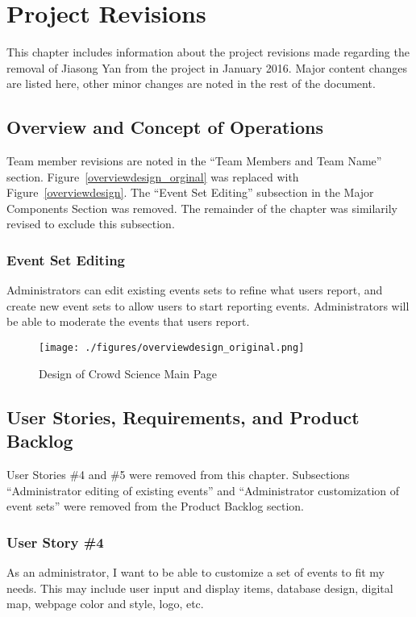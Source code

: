 

\chapter{Project Revisions}\label{chap:revisions}
This chapter includes information about the project revisions made regarding the removal of Jiasong Yan from the project in January 2016. Major content changes are listed here, other minor changes are noted in the rest of the document.

\section{Overview and Concept of Operations}
Team member revisions are noted in the ``Team Members and Team Name'' section.  Figure~\ref{overviewdesign_orginal} was replaced with Figure~\ref{overviewdesign}. The ``Event Set Editing'' subsection in the Major Components Section was removed. The remainder of the chapter was similarily revised to exclude this subsection.

\subsection{Event Set Editing}
Administrators can edit existing events sets to refine what users report, and create new event sets to allow users to start reporting events.  Administrators will be able to moderate the events that users report.

\begin{figure}[tbh]
\begin{center}
\texttt{[image: ./figures/overviewdesign\_original.png]}
\end{center}
\caption{Design of Crowd Science Main Page\label{overviewdesign_original}}
\end{figure}

\section{User Stories, Requirements, and Product Backlog}
User Stories \#4 and \#5 were removed from this chapter. Subsections ``Administrator editing of existing events'' and ``Administrator customization of event sets'' were removed from the Product Backlog section.

\subsection{User Story \#4} 
As an administrator, I want to be able to customize a set of events to fit my needs. This may include user input and display items, database design, digital map, webpage color and style, logo, etc. 
